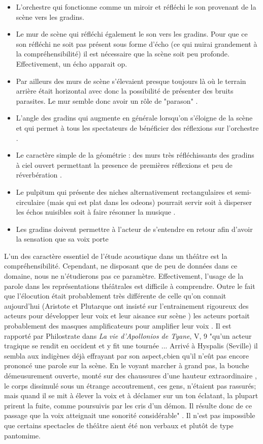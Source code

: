 \begin{itemize}
\item L'orchestre qui fonctionne comme un miroir et réfléchi le son provenant de la scène vers les gradins.
\item Le mur de scène qui réfléchi également le son vers les gradins. Pour que ce son réfléchi ne soit pas présent sous forme d'écho (ce qui nuirai grandement à la compréhensibilité) il est nécessaire que la scène soit peu profonde. Effectivement, un écho apparait op. 
\item Par ailleurs des murs de scène s'élevaient presque toujours là où le terrain arrière était horizontal avec donc la possibilité de présenter des bruits parasites. Le mur semble donc avoir un rôle de "parason" \cite[p.38]{canac}.
\item L'angle des gradins qui augmente en générale lorsqu'on s'éloigne de la scène et qui permet à tous les spectateurs de bénéficier des réflexions sur l'orchestre \cite[p.103-109]{canac}.
\item Le caractère simple de la géométrie : des murs très réfléchissants des gradins à ciel ouvert permettant la presence de premières réflexions et peu de réverbération \cite[p.33]{canac}.
\item Le \gls{pulpitum} qui présente des niches alternativement rectangulaires et semi-circulaire (mais qui est plat dans les \glspl{odeon}) pourrait servir soit à disperser les échos nuisibles soit à faire résonner la musique \cite[p.38]{canac}.
\item Les gradins doivent permettre à l'acteur de s'entendre en retour afin d'avoir la sensation que sa voix porte \cite[p.42 - tab.II-4]{canac}
\end{itemize}
L'un des caractère essentiel de l'étude acoustique dans un théâtre est la compréhensibilité. Cependant, ne disposant que de peu de données dans ce domaine, nous ne n'étudierons pas ce paramètre. Effectivement, l'usage de la parole dans les représentations théâtrales est difficile à comprendre. Outre le fait que l'élocution était probablement très différente de celle qu'on connait aujourd'hui (Aristote \cite[Chap IV - XIV]{aristote} et Plutarque ont insisté sur l'entrainement rigoureux des acteurs pour développer leur voix et leur aisance sur scène \cite[p.39]{canac}) les acteurs portait probablement des masques amplificateurs pour amplifier leur voix \cite[p.362]{arnaud}. Il est rapporté par Philostrate dans \textit{La vie d'Apollonios de Tyane}, V, 9 "qu'un acteur tragique se rendit en occident et y fit une tournée ... Arrivé à Hyspalis (Seville) il sembla aux indigènes déjà effrayant par son aspect,cbien qu'il n'eût pas encore prononcé une parole sur la scène. En le voyant marcher à grand pas, la bouche démeusurement ouverte, monté sur des chaussures d'une hauteur extraordinaire , le corps dissimulé sous un étrange accoutrement, ces gens, n'étaient pas rassurés; mais quand il se mit à élever la voix et à déclamer sur un ton éclatant, la plupart prirent la fuite, comme poursuivis par les cris d'un démon. Il résulte donc de ce passage que la voix atteignait une sonorité considérable" \cite[p.43]{formige}. Il n'est pas impossible que certains spectacles de théâtre aient été non verbaux et plutôt de type pantomime.
	

